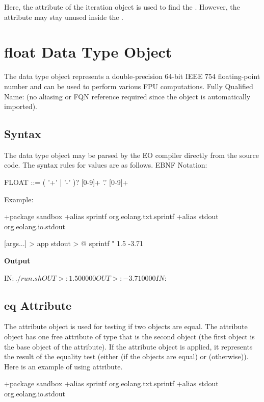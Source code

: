\documentclass[12pt]{book}
\begin{document}
{Here, the  attribute of the  iteration object is 
used to find the . However, the  attribute may 
stay unused inside the .

\section{float Data Type Object}
The  data type object represents a double-precision 64-bit IEEE 754 floating-point number and can be used to perform various FPU computations.
Fully Qualified Name:  (no aliasing or FQN reference required since the object is automatically imported).

\subsection{Syntax}
The  data type object may be parsed by the EO compiler directly from the source code. The syntax rules for values are as follows. EBNF Notation:

\begin{ffcode}
FLOAT    ::= ( '+' | '-' )? [0-9]+ '.' [0-9]+
\end{ffcode}
Example:
\begin{ffcode}
+package sandbox
+alias sprintf org.eolang.txt.sprintf
+alias stdout org.eolang.io.stdout

[args...] > app
  stdout > @
    sprintf
      "%
      1.5
      -3.71
\end{ffcode}
\textbf{Output}
\begin{ffcode}
IN$: ./run.sh
OUT>: 1.500000
OUT>: -3.710000
IN$: 
\end{ffcode}

\subsection{eq Attribute}
The  attribute object is used for testing if two  objects are equal. The  attribute object has one free attribute  of type  that is the second object (the first object is the base object of the  attribute).
If the  attribute object is applied, it represents the result of the equality test (either  (if the objects are equal) or  (otherwise)). Here is an example of using  attribute.

\begin{ffcode}
+package sandbox
+alias sprintf org.eolang.txt.sprintf
+alias stdout org.eolang.io.stdout


\end{ffcode}}
\end{document}
